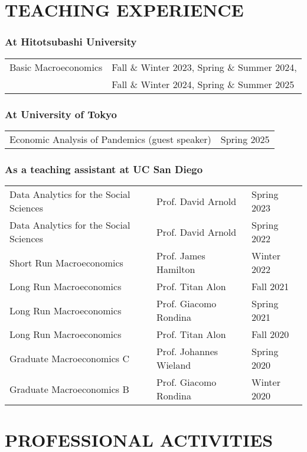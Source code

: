 \documentclass[12pt]{article}
\begin{document}

\section*{TEACHING EXPERIENCE}
\subsubsection*{At Hitotsubashi University}
\begin{tabular}{@{}ll}
Basic Macroeconomics&Fall \& Winter 2023, Spring \& Summer 2024, \\
                    &Fall \& Winter 2024, Spring \& Summer 2025\\
\end{tabular}

\subsubsection*{At University of Tokyo}
\begin{tabular}{@{}ll}
Economic Analysis of Pandemics (guest speaker)&Spring 2025
\end{tabular}

\subsubsection*{As a teaching assistant at UC San Diego}
\begin{tabular}{@{}lll}
Data Analytics for the Social Sciences&Prof. David Arnold&Spring 2023\\
Data Analytics for the Social Sciences&Prof. David Arnold&Spring 2022\\
Short Run Macroeconomics&Prof. James Hamilton&Winter 2022\\
Long Run Macroeconomics&Prof. Titan Alon&Fall 2021\\
Long Run Macroeconomics&Prof. Giacomo Rondina&Spring 2021\\
Long Run Macroeconomics&Prof. Titan Alon&Fall 2020\\
Graduate Macroeconomics C&Prof. Johannes Wieland&Spring 2020\\
Graduate Macroeconomics B&Prof. Giacomo Rondina&Winter 2020
\end{tabular}

\section*{PROFESSIONAL ACTIVITIES}
\end{document}
